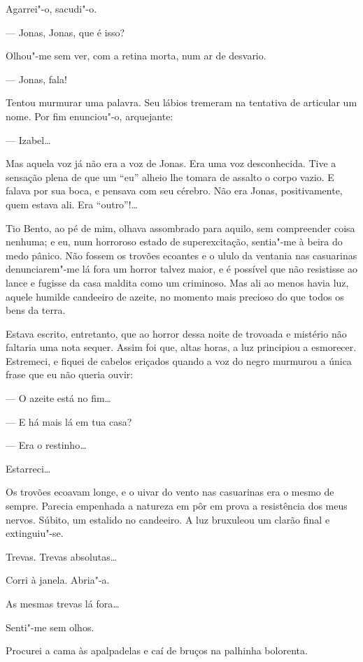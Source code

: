 Agarrei"-o, sacudi"-o.

--- Jonas, Jonas, que é isso?

Olhou"-me sem ver, com a retina morta, num ar de desvario.

--- Jonas, fala!

Tentou murmurar uma palavra. Seu lábios tremeram na tentativa de
articular um nome. Por fim enunciou"-o, arquejante:

--- Izabel\ldots{}

Mas aquela voz já não era a voz de Jonas. Era uma voz desconhecida. Tive
a sensação plena de que um ``eu'' alheio lhe tomara de assalto o corpo
vazio. E falava por sua boca, e pensava com seu cérebro. Não era Jonas,
positivamente, quem estava ali. Era ``outro''!\ldots{}

Tio Bento, ao pé de mim, olhava assombrado para aquilo, sem compreender
coisa nenhuma; e eu, num horroroso estado de superexcitação, sentia"-me à
beira do medo pânico. Não fossem os trovões ecoantes e o ululo da
ventania nas casuarinas denunciarem"-me lá fora um horror talvez maior, e
é possível que não resistisse ao lance e fugisse da casa maldita como um
criminoso. Mas ali ao menos havia luz, aquele humilde candeeiro de
azeite, no momento mais precioso do que todos os bens da terra.

Estava escrito, entretanto, que ao horror dessa noite de trovoada e
mistério não faltaria uma nota sequer. Assim foi que, altas horas, a luz
principiou a esmorecer. Estremeci, e fiquei de cabelos eriçados quando a
voz do negro murmurou a única frase que eu não queria ouvir:

--- O azeite está no fim\ldots{}

--- E há mais lá em tua casa?

--- Era o restinho\ldots{}

Estarreci\ldots{}

Os trovões ecoavam longe, e o uivar do vento nas casuarinas era o mesmo
de sempre. Parecia empenhada a natureza em pôr em prova a resistência
dos meus nervos. Súbito, um estalido no candeeiro. A luz bruxuleou um
clarão final e extinguiu"-se.

Trevas. Trevas absolutas\ldots{}

Corri à janela. Abria"-a.

As mesmas trevas lá fora\ldots{}

Senti"-me sem olhos.

Procurei a cama às apalpadelas e caí de bruços na palhinha bolorenta.

